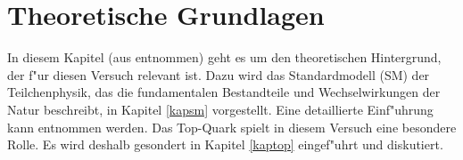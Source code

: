 \section{Theoretische Grundlagen}
\label{sm_chapter}
In diesem Kapitel (aus \cite{ref:stoever} entnommen) geht es um den theoretischen Hintergrund, der f"ur diesen Versuch relevant ist. Dazu wird das Standardmodell (SM) der Teilchenphysik, das die fundamentalen Bestandteile und Wechselwirkungen der Natur beschreibt, in Kapitel \ref{kapsm} vorgestellt. Eine detaillierte Einf"uhrung kann \cite{Griffiths, Berger} entnommen werden. Das Top-Quark spielt in diesem Versuch eine besondere Rolle. Es wird deshalb gesondert in Kapitel \ref{kaptop} eingef"uhrt und diskutiert.

